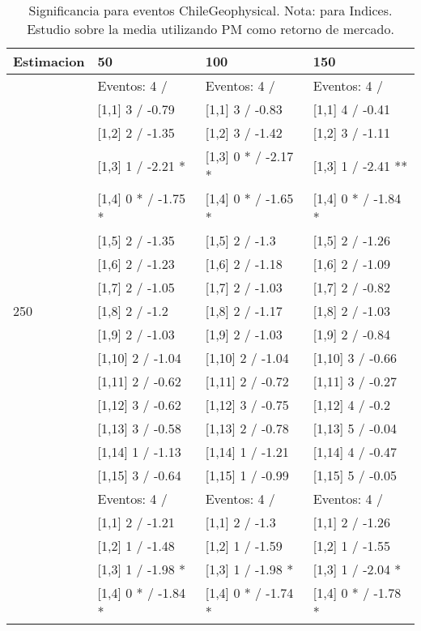 \begin{table}

\caption{Significancia para eventos ChileGeophysical. Nota: para Indices. Estudio sobre la media utilizando PM como retorno de mercado.}
\centering
\begin{tabular}[t]{llll}
\toprule
Estimacion & 50 & 100 & 150\\
\midrule
 & Eventos:  4 / & Eventos:  4 / & Eventos:  4 /\\
 & {}[1,1] 3  / -0.79 & {}[1,1] 3  / -0.83 & {}[1,1] 4  / -0.41\\
 & {}[1,2] 2  / -1.35 & {}[1,2] 3  / -1.42 & {}[1,2] 3  / -1.11\\
 & {}[1,3] 1  / -2.21 * & {}[1,3] 0 * / -2.17 * & {}[1,3] 1  / -2.41 **\\
 & {}[1,4] 0 * / -1.75 * & {}[1,4] 0 * / -1.65 * & {}[1,4] 0 * / -1.84 *\\
\addlinespace
 & {}[1,5] 2  / -1.35 & {}[1,5] 2  / -1.3 & {}[1,5] 2  / -1.26\\
 & {}[1,6] 2  / -1.23 & {}[1,6] 2  / -1.18 & {}[1,6] 2  / -1.09\\
 & {}[1,7] 2  / -1.05 & {}[1,7] 2  / -1.03 & {}[1,7] 2  / -0.82\\
250 & {}[1,8] 2  / -1.2 & {}[1,8] 2  / -1.17 & {}[1,8] 2  / -1.03\\
 & {}[1,9] 2  / -1.03 & {}[1,9] 2  / -1.03 & {}[1,9] 2  / -0.84\\
\addlinespace
 & {}[1,10] 2  / -1.04 & {}[1,10] 2  / -1.04 & {}[1,10] 3  / -0.66\\
 & {}[1,11] 2  / -0.62 & {}[1,11] 2  / -0.72 & {}[1,11] 3  / -0.27\\
 & {}[1,12] 3  / -0.62 & {}[1,12] 3  / -0.75 & {}[1,12] 4  / -0.2\\
 & {}[1,13] 3  / -0.58 & {}[1,13] 2  / -0.78 & {}[1,13] 5  / -0.04\\
 & {}[1,14] 1  / -1.13 & {}[1,14] 1  / -1.21 & {}[1,14] 4  / -0.47\\
\addlinespace
 & {}[1,15] 3  / -0.64 & {}[1,15] 1  / -0.99 & {}[1,15] 5  / -0.05\\
 & Eventos:  4 / & Eventos:  4 / & Eventos:  4 /\\
 & {}[1,1] 2  / -1.21 & {}[1,1] 2  / -1.3 & {}[1,1] 2  / -1.26\\
 & {}[1,2] 1  / -1.48 & {}[1,2] 1  / -1.59 & {}[1,2] 1  / -1.55\\
 & {}[1,3] 1  / -1.98 * & {}[1,3] 1  / -1.98 * & {}[1,3] 1  / -2.04 *\\
\addlinespace
 & {}[1,4] 0 * / -1.84 * & {}[1,4] 0 * / -1.74 * & {}[1,4] 0 * / -1.78 *\\

\end{tabular}
\end{table}
